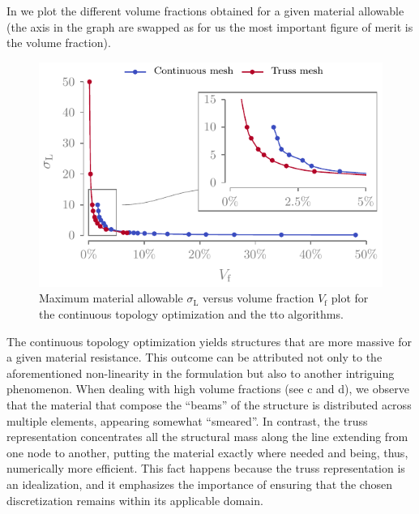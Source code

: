 In  we plot the different volume fractions obtained for a given material allowable (the axis in the graph are swapped as for us the most important figure of merit is the volume fraction).
\begin{figure}
    \centering
    \includegraphics{figures/03_comparison_TO_TTO/15_stress_vol/stress_vol.pdf}
    \caption{Maximum material allowable $\sigma_\text{L}$ versus volume fraction $V_\text{f}$ plot for the continuous topology optimization and the \gls{tto} algorithms.}
    \label{fig:03_stress_vol}
\end{figure}
The continuous topology optimization yields structures that are more massive for a given material resistance. This outcome can be attributed not only to the aforementioned non-linearity in the formulation but also to another intriguing phenomenon. When dealing with high volume fractions (see \eg {}c and d), we observe that the material that compose the “beams” of the structure is distributed across multiple elements, appearing somewhat “smeared”. In contrast, the truss representation concentrates all the structural mass along the line extending from one node to another, putting the material exactly where needed and being, thus, numerically more efficient. This fact happens because the truss representation is an idealization, and it emphasizes the importance of ensuring that the chosen discretization remains within its applicable domain.

